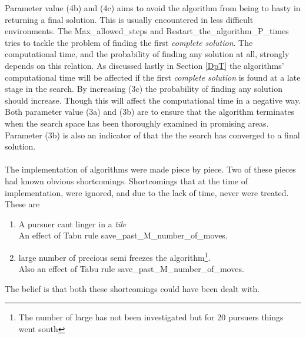 Parameter value (4b) and (4c) aims to avoid the algorithm from being to hasty in returning a final solution. This is usually encountered in less difficult environments. The Max\_allowed\_steps and Restart\_the\_algorithm\_P\_times tries to tackle the problem of finding the first \emph{complete solution}. The computational time, and the probability of finding any solution at all, strongly depends on this relation. As discussed lastly in Section \ref{DpT} the algorithms' computational time will be affected if the first \emph{complete solution} is found at a late stage in the search. By increasing (3c) the probability of finding any solution should increase. Though this will affect the computational time in a negative way. Both parameter value (3a) and (3b) are to ensure that the algorithm terminates when the search space has been thoroughly examined in promising areas.
Parameter (3b) is also an indicator of that the the search has converged to a final solution.\\
\\
The implementation of algorithms were made piece by piece. Two of these pieces had known obvious shortcomings. Shortcomings that at the time of implementation, were ignored, and due to the lack of time, never were treated. These are\\
\begin{enumerate}
\item{} A pursuer cant linger in a \emph{tile} \vspace{0,1cm}\\
 An effect of Tabu rule save\_past\_M\_number\_of\_moves.
\item{} large number of precious semi freezes the algorithm\footnote{ The number of large has not been investigated but for 20 pursuers things went south }. \vspace{0,1cm}\\
Also an effect of Tabu rule save\_past\_M\_number\_of\_moves.
\end{enumerate} 
The belief is that both these shortcomings could have been dealt with.


